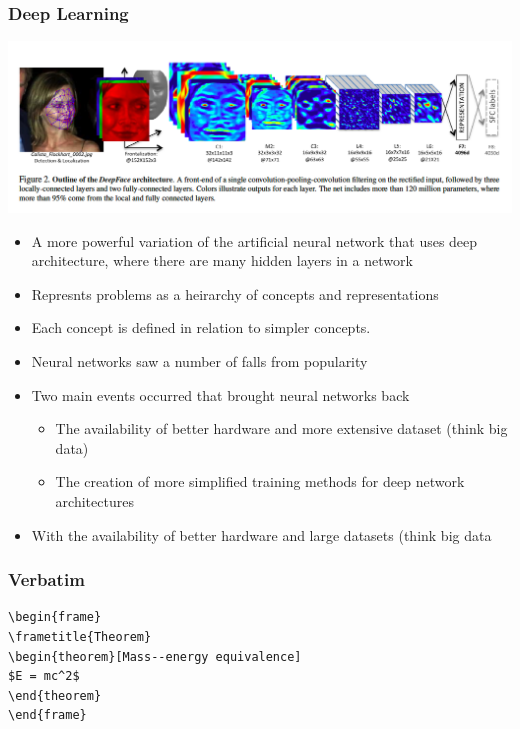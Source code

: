 \documentclass{beamer}
\begin{document}
\begin{frame}
    \frametitle{Deep Learning}
    \begin{center}
        \includegraphics[scale=.27]{deepface}
    \end{center}
    \begin{itemize}
        \item A more powerful variation of the artificial neural network that uses deep architecture, where there are many hidden layers in a network
        \item Represnts problems as a heirarchy of concepts and representations
        \item Each concept is defined in relation to simpler concepts.
    \end{itemize}
\end{frame}
\begin{frame}
    \begin{itemize}
        \item Neural networks saw a number of falls from popularity
        \item Two main events occurred that brought neural networks back
        \begin{itemize}
            \item The availability of better hardware and more extensive dataset (think big data)
            \item The creation of more simplified training methods for deep network architectures
        \end{itemize}
        \item With the availability of better hardware and large datasets (think big data
    \end{itemize}
\end{frame}

\begin{frame}[fragile] %
\frametitle{Verbatim}
\begin{example}
\begin{verbatim}
\begin{frame}
\frametitle{Theorem}
\begin{theorem}[Mass--energy equivalence]
$E = mc^2$
\end{theorem}
\end{frame}\end{verbatim}
\end{example}
\end{frame}
\end{document}
